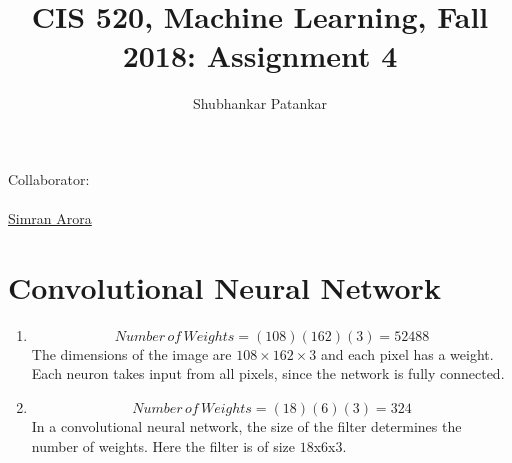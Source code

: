 \documentclass[english]{article}
\title{CIS 520, Machine Learning, Fall 2018: Assignment 4\\}
\date{}
\author{Shubhankar Patankar}
\begin{document}
\maketitle
{\normalsize Collaborator:\\
\\ \underline{Simran Arora}}


\section{Convolutional Neural Network}
\begin{enumerate}
    \item $$Number \, of \, Weights  = (108)(162)(3) = 52488$$
     	The dimensions of the image are $108 \times162 \times 3$ and each pixel has a weight. Each neuron takes input from all pixels, since the network is fully connected.
    
    \item $$Number \, of \, Weights  = (18)(6)(3) = 324$$
    	In a convolutional  neural network, the size of the filter determines the number of weights. Here the filter is of size $18$x$6$x$3$.
    

\end{enumerate}
\end{document}
